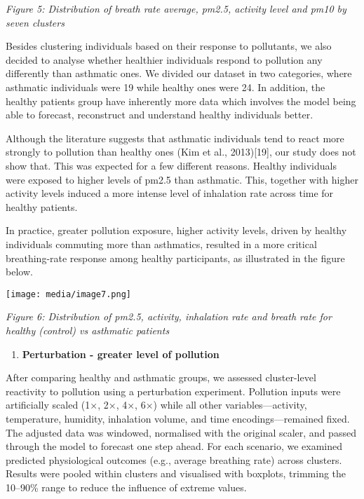 \documentclass[
]{article}
\begin{document}
\emph{Figure 5: Distribution of breath rate average, pm2.5, activity
level and pm10 by seven clusters}

Besides clustering individuals based on their response to pollutants, we
also decided to analyse whether healthier individuals respond to
pollution any differently than asthmatic ones. We divided our dataset in
two categories, where asthmatic individuals were 19 while healthy ones
were 24. In addition, the healthy patients group have inherently more
data which involves the model being able to forecast, reconstruct and
understand healthy individuals better.

Although the literature suggests that asthmatic individuals tend to
react more strongly to pollution than healthy ones (Kim et al.,
2013){[}19{]}, our study does not show that. This was expected for a few
different reasons. Healthy individuals were exposed to higher levels of
pm2.5 than asthmatic. This, together with higher activity levels induced
a more intense level of inhalation rate across time for healthy
patients.

In practice, greater pollution exposure, higher activity levels, driven
by healthy individuals commuting more than asthmatics, resulted in a
more critical breathing-rate response among healthy participants, as
illustrated in the figure below.

\texttt{[image: media/image7.png]}

\emph{Figure 6: Distribution of pm2.5, activity, inhalation rate and
breath rate for healthy (control) vs asthmatic patients}

\begin{enumerate}
\def\labelenumi{\arabic{enumi}.}
\setcounter{enumi}{2}
\item
  \textbf{Perturbation - greater level of pollution}
\end{enumerate}

After comparing healthy and asthmatic groups, we assessed cluster-level
reactivity to pollution using a perturbation experiment. Pollution
inputs were artificially scaled (1×, 2×, 4×, 6×) while all other
variables---activity, temperature, humidity, inhalation volume, and time
encodings---remained fixed. The adjusted data was windowed, normalised
with the original scaler, and passed through the model to forecast one
step ahead. For each scenario, we examined predicted physiological
outcomes (e.g., average breathing rate) across clusters. Results were
pooled within clusters and visualised with boxplots, trimming the
10--90\% range to reduce the influence of extreme values.
\end{document}
